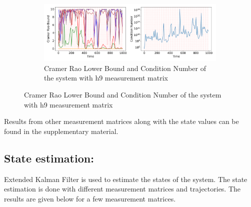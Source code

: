 \documentclass[12pt]{article}
\begin{document}
\begin{figure}[H]
    \\
    \begin{subfigure}[t]{\textwidth}
        \centering
        \includegraphics[width=15cm]{figures/crb_and_cn_with_noisy_sinusoidal_x_and_h9.png}
        \caption{Cramer Rao Lower Bound and Condition Number of the system with h9 measurement matrix}
        \label{fig:04d}
    \end{subfigure}
\end{figure}
Results from other measurement matrices along with the state values can be found in the supplementary material.


\subsection*{State estimation:}
Extended Kalman Filter is used to estimate the states of the system. The state estimation is done with different measurement matrices and trajectories. The results are given below for a few measurement matrices. 
\end{document}
